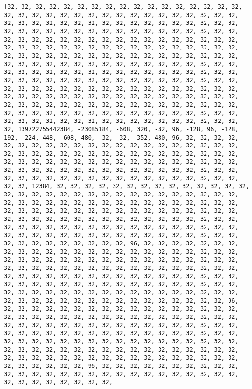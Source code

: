 \documentclass[11pt]{article}
\begin{document}
    \begin{Verbatim}[commandchars=\\\{\}]
[32, 32, 32, 32, 32, 32, 32, 32, 32, 32, 32, 32, 32, 32, 32, 32, 32, 32, 32, 32, 32, 32, 32, 32, 32, 32, 32, 32, 32, 32, 32, 32, 32, 32, 32, 32, 32, 32, 32, 32, 32, 32, 32, 32, 32, 32, 32, 32, 32, 32, 32, 32, 32, 32, 32, 32, 32, 32, 32, 32, 32, 32, 32, 32, 32, 32, 32, 32, 32, 32, 32, 32, 32, 32, 32, 32, 32, 32, 32, 32, 32, 32, 32, 32, 32, 32, 32, 32, 32, 32, 32, 32, 32, 32, 32, 32, 32, 32, 32, 32, 32, 32, 32, 32, 32, 32, 32, 32, 32, 32, 32, 32, 32, 32, 32, 32, 32, 32, 32, 32, 32, 32, 32, 32, 32, 32, 32, 32, 32, 32, 32, 32, 32, 32, 32, 32, 32, 32, 32, 32, 32, 32, 32, 32, 32, 32, 32, 32, 32, 32, 32, 32, 32, 32, 32, 32, 32, 32, 32, 32, 32, 32, 32, 32, 32, 32, 32, 32, 32, 32, 32, 32, 32, 32, 32, 32, 32, 32, 32, 32, 32, 32, 32, 32, 32, 32, 32, 32, 32, 32, 32, 32, 32, 32, 32, 32, 32, 32, 32, 32, 32, 32, 32, 32, 32, 32, 32, 32, 32, 32, 32, 32, 32, 32, 32, 32, 32, 32, 32, 32, 32, 32, 32, 32, 32, 32, 32, 32, 32, 32, 32, 32, 32, 32, 32, 32, 32, 32, 32, 32, 32, 32, 32, 32, 32, 32, 32, 32, 32, 32, 32, 32, 32, 32, 32, 32, 139722755442384, -23085184, -608, 320, -32, 96, -128, 96, -128, 192, -224, 448, -608, 480, -32, -32, -352, 480, 96, 32, 32, 32, 32, 32, 32, 32, 32, 32, 32, 32, 32, 32, 32, 32, 32, 32, 32, 32, 32, 32, 32, 32, 32, 32, 32, 32, 32, 32, 32, 32, 32, 32, 32, 32, 32, 32, 32, 32, 32, 32, 32, 32, 32, 32, 32, 32, 32, 32, 32, 32, 32, 32, 32, 32, 32, 32, 32, 32, 32, 32, 32, 32, 32, 32, 32, 32, 32, 32, 32, 32, 32, 32, 32, 32, 32, 32, 32, 32, 32, 32, 32, 32, 32, 32, 32, 32, 32, 32, 32, 32, 12384, 32, 32, 32, 32, 32, 32, 32, 32, 32, 32, 32, 32, 32, 32, 32, 32, 32, 32, 32, 32, 32, 32, 32, 32, 32, 32, 32, 32, 32, 32, 32, 32, 32, 32, 32, 32, 32, 32, 32, 32, 32, 32, 32, 32, 32, 32, 32, 32, 32, 32, 32, 32, 32, 32, 32, 32, 32, 32, 32, 32, 32, 32, 32, 32, 32, 32, 32, 32, 32, 32, 32, 32, 32, 32, 32, 32, 32, 32, 32, 32, 32, 32, 32, 32, 32, 32, 32, 32, 32, 32, 32, 32, 32, 32, 32, 32, 32, 32, 32, 32, 32, 32, 32, 32, 32, 32, 32, 32, 32, 32, 32, 32, 32, 32, 32, 32, 32, 32, 32, 32, 32, 32, 32, 32, 32, 96, 32, 32, 32, 32, 32, 32, 32, 32, 32, 32, 32, 32, 32, 32, 32, 32, 32, 32, 32, 32, 32, 32, 32, 32, 32, 32, 32, 32, 32, 32, 32, 32, 32, 32, 32, 32, 32, 32, 32, 32, 32, 32, 32, 32, 32, 32, 32, 32, 32, 32, 32, 32, 32, 32, 32, 32, 32, 32, 32, 32, 32, 32, 32, 32, 32, 32, 32, 32, 32, 32, 32, 32, 32, 32, 32, 32, 32, 32, 32, 32, 32, 32, 32, 32, 32, 32, 32, 32, 32, 32, 32, 32, 32, 32, 32, 32, 32, 32, 32, 32, 32, 32, 32, 32, 32, 32, 32, 32, 32, 32, 32, 32, 32, 32, 32, 32, 32, 32, 32, 32, 32, 32, 32, 32, 32, 96, 32, 32, 32, 32, 32, 32, 32, 32, 32, 32, 32, 32, 32, 32, 32, 32, 32, 32, 32, 32, 32, 32, 32, 32, 32, 32, 32, 32, 32, 32, 32, 32, 32, 32, 32, 32, 32, 32, 32, 32, 32, 32, 32, 32, 32, 32, 32, 32, 32, 32, 32, 32, 32, 32, 32, 32, 32, 32, 32, 32, 32, 32, 32, 32, 32, 32, 32, 32, 32, 32, 32, 32, 32, 32, 32, 32, 32, 32, 32, 32, 32, 32, 32, 32, 32, 32, 32, 32, 32, 32, 32, 32, 32, 32, 32, 32, 32, 32, 32, 32, 32, 32, 32, 32, 32, 32, 32, 32, 32, 32, 32, 32, 32, 32, 32, 32, 32, 32, 32, 32, 32, 32, 32, 32, 32, 96, 32, 32, 32, 32, 32, 32, 32, 32, 32, 32, 32, 32, 32, 32, 32, 32, 32, 32, 32, 32, 32, 32, 32, 32, 32, 32, 32, 32, 32, 32, 32, 32, 32, 32, 32, 
\end{Verbatim}
\end{document}
